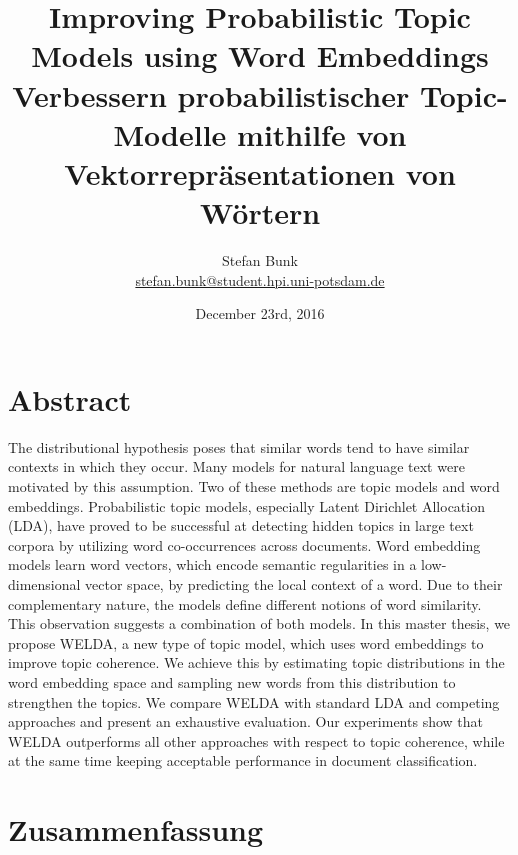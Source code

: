 \documentclass[
        a4paper,
        titlepage,
        twoside,
        parskip,
        numbers=noenddot
        ]{scrbook}
\title{Improving Probabilistic Topic Models using Word Embeddings
\\ \bigskip
\large{Verbessern probabilistischer Topic-Modelle mithilfe von Vektorrepräsentationen von Wörtern}}
\author{Stefan Bunk\\{\small{\url{stefan.bunk@student.hpi.uni-potsdam.de}}}}
\date{December 23rd, 2016}
\theoremstyle{break}
\begin{document}
\maketitle
\cleardoublepage

\makeatletter
\@openrightfalse

\chapter*{Abstract}
The distributional hypothesis poses that similar words tend to have similar contexts in which they occur.
Many models for natural language text were motivated by this assumption.
Two of these methods are topic models and word embeddings.
Probabilistic topic models, especially Latent Dirichlet Allocation (LDA), have proved to be successful at detecting hidden topics in large text corpora by utilizing word co-occurrences across documents.
Word embedding models learn word vectors, which encode semantic regularities in a low-dimensional vector space, by predicting the local context of a word.
Due to their complementary nature, the models define different notions of word similarity.
This observation suggests a combination of both models.
In this master thesis, we propose WELDA, a new type of topic model, which uses word embeddings to improve topic coherence.
We achieve this by estimating topic distributions in the word embedding space and sampling new words from this distribution to strengthen the topics.
We compare WELDA with standard LDA and competing approaches and present an exhaustive evaluation.
Our experiments show that WELDA outperforms all other approaches with respect to topic coherence, while at the same time keeping acceptable performance in document classification.

\chapter*{Zusammenfassung}
\end{document}
